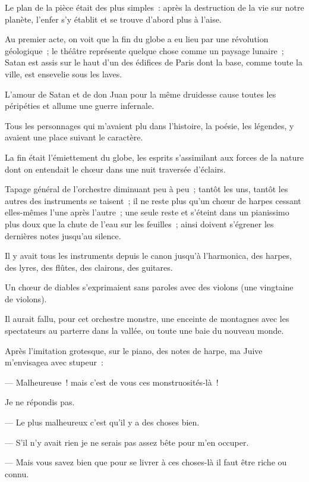\documentclass[french,twoside]{book} %
\begin{document}
\noindent Le plan de la pièce était des plus simples : après la destruction de la vie sur notre planète, l’enfer s’y établit et se trouve d’abord plus à l’aise.\par
Au premier acte, on voit que la fin du globe a eu lieu par une révolution géologique ; le théâtre représente quelque chose comme un paysage lunaire ; Satan est assis sur le haut d’un des édifices de Paris dont la base, comme toute la ville, est ensevelie sous les laves.\par
L’amour de Satan et de don Juan pour la même druidesse cause toutes les péripéties et allume une guerre infernale.\par
Tous les personnages qui m’avaient plu dans l’histoire, la poésie, les légendes, y avaient une place suivant le caractère.\par
La fin était l’émiettement du globe, les esprits  s’assimilant aux forces de la nature dont on entendait le chœur dans une nuit traversée d’éclairs.\par
Tapage général de l’orchestre diminuant peu à peu ; tantôt les uns, tantôt les autres des instruments se taisent ; il ne reste plus qu’un chœur de harpes cessant elles-mêmes l’une après l’autre ; une seule reste et s’éteint dans un pianissimo plus doux que la chute de l’eau sur les feuilles ; ainsi doivent s’égrener les dernières notes jusqu’au silence.\par
Il y avait tous les instruments depuis le canon jusqu’à l’harmonica, des harpes, des lyres, des flûtes, des clairons, des guitares.\par
Un chœur de diables s’exprimaient sans paroles avec des violons (une vingtaine de violons).\par
Il aurait fallu, pour cet orchestre monstre, une enceinte de montagnes avec les spectateurs au parterre dans la vallée, ou toute une baie du nouveau monde.\par
Après l’imitation grotesque, sur le piano, des notes de harpe, ma Juive m’envisagea avec stupeur :\par
— Malheureuse ! mais c’est de vous ces monstruosités-là !\par
Je ne répondis pas.\par
 — Le plus malheureux c’est qu’il y a des choses bien.\par
— S’il n’y avait rien je ne serais pas assez bête pour m’en occuper.\par
— Mais vous savez bien que pour se livrer à ces choses-là il faut être riche ou connu.\par
\end{document}
